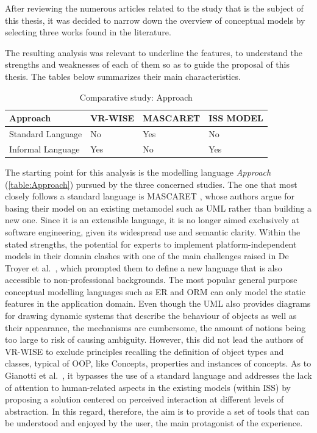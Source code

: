 After reviewing the numerous articles related to the study that is the subject of this thesis, it was decided to narrow down the overview of conceptual models by selecting three works found in the literature.

The resulting analysis was relevant to underline the features, to understand the strengths and weaknesses of each of them so as to guide the proposal of this thesis. The tables below summarizes their main characteristics. 

\begin{table}[h]
\begin{tabular}{|p{2.5cm}|p{3cm}|p{3cm}|p{3cm}|} 
\hline %
\textbf{Approach} 
& \textbf{VR-WISE} 
& \textbf{MASCARET}
& \textbf{ISS MODEL} \\ 
\hline
Standard Language
& No
& Yes
& No\\ 
\hline
Informal Language
& Yes
& No
& Yes\\ 
\hline
\end{tabular} 
\caption{Comparative study: Approach}
\label{table:Approach}
\end{table}

The starting point for this analysis is the modelling language \textit{Approach} (\autoref{table:Approach}) pursued by the three concerned studies. The one that most closely follows a standard language is MASCARET \cite{chevaillier_semantic_2012}, whose authors argue for basing their model on an existing metamodel such as UML \cite{fowler_uml_2000} rather than building a new one. Since it is an extensible language, it is no longer aimed exclusively at software engineering, given its widespread use and semantic clarity. Within the stated strengths, the potential for experts to implement platform-independent models in their domain clashes with one of the main challenges raised in De Troyer et al.~\cite{de_troyer_conceptual_2007}, which prompted them to define a new language that is also accessible to non-professional backgrounds. 
The most popular general purpose conceptual modelling languages such as ER \cite{chen_context-aware_2019} and ORM \cite{halpin_conceptual_1995} can only model the static features in the application domain. Even though the UML also provides diagrams for drawing dynamic systems that describe the behaviour of objects as well as their appearance, the mechanisms are cumbersome, the amount of notions being too large to risk of causing ambiguity. However, this did not lead the authors of VR-WISE to exclude principles recalling the definition of object types and classes, typical of OOP, like Concepts, properties and instances of concepts. 
As to Gianotti et al.~\cite{dobbie_modeling_2020}, it bypasses the use of a standard language and addresses the lack of attention to human-related aspects in the existing models (within ISS) by proposing a solution centered on perceived interaction at different levels of abstraction. In this regard, therefore, the aim is to provide a set of tools that can be understood and enjoyed by the user, the main protagonist of the experience. 


